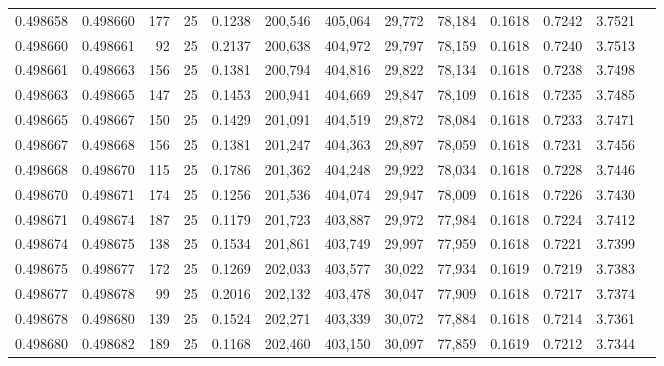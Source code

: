\begin{tabular}{rrrrrrrrrrrrr}
0.498658 & 0.498660 & 177 &  25 &                                     0.1238 & 200,546 & 405,064 &  29,772 &  78,184 & 0.1618 & 0.7242 & 3.7521 \\
0.498660 & 0.498661 &  92 &  25 &                                     0.2137 & 200,638 & 404,972 &  29,797 &  78,159 & 0.1618 & 0.7240 & 3.7513 \\
0.498661 & 0.498663 & 156 &  25 &                                     0.1381 & 200,794 & 404,816 &  29,822 &  78,134 & 0.1618 & 0.7238 & 3.7498 \\
0.498663 & 0.498665 & 147 &  25 &                                     0.1453 & 200,941 & 404,669 &  29,847 &  78,109 & 0.1618 & 0.7235 & 3.7485 \\
0.498665 & 0.498667 & 150 &  25 &                                     0.1429 & 201,091 & 404,519 &  29,872 &  78,084 & 0.1618 & 0.7233 & 3.7471 \\
0.498667 & 0.498668 & 156 &  25 &                                     0.1381 & 201,247 & 404,363 &  29,897 &  78,059 & 0.1618 & 0.7231 & 3.7456 \\
0.498668 & 0.498670 & 115 &  25 &                                     0.1786 & 201,362 & 404,248 &  29,922 &  78,034 & 0.1618 & 0.7228 & 3.7446 \\
0.498670 & 0.498671 & 174 &  25 &                                     0.1256 & 201,536 & 404,074 &  29,947 &  78,009 & 0.1618 & 0.7226 & 3.7430 \\
0.498671 & 0.498674 & 187 &  25 &                                     0.1179 & 201,723 & 403,887 &  29,972 &  77,984 & 0.1618 & 0.7224 & 3.7412 \\
0.498674 & 0.498675 & 138 &  25 &                                     0.1534 & 201,861 & 403,749 &  29,997 &  77,959 & 0.1618 & 0.7221 & 3.7399 \\
0.498675 & 0.498677 & 172 &  25 &                                     0.1269 & 202,033 & 403,577 &  30,022 &  77,934 & 0.1619 & 0.7219 & 3.7383 \\
0.498677 & 0.498678 &  99 &  25 &                                     0.2016 & 202,132 & 403,478 &  30,047 &  77,909 & 0.1618 & 0.7217 & 3.7374 \\
0.498678 & 0.498680 & 139 &  25 &                                     0.1524 & 202,271 & 403,339 &  30,072 &  77,884 & 0.1618 & 0.7214 & 3.7361 \\
0.498680 & 0.498682 & 189 &  25 &                                     0.1168 & 202,460 & 403,150 &  30,097 &  77,859 & 0.1619 & 0.7212 & 3.7344 \\

\end{tabular}
